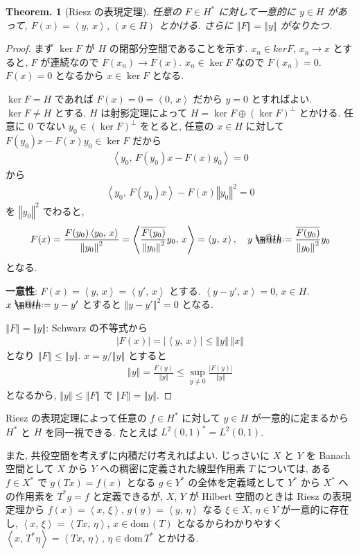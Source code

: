 \documentclass[openany, a4paper, oneside]{jsbook}
\makeatletter
\newcommand*{\defeq}{\mathrel{\rlap{%
\raisebox{0.3ex}{$\m@th\cdot$}}%
\raisebox{-0.3ex}{$\m@th\cdot$}}%
=}
\newcommand{\dom}{\mathrm{dom}\,}
\theoremstyle{break}
\newtheorem{thm}{Theorem.}[section]
\theoremstyle{breakdefn}
\newcommand{\abs}[1]{\left|#1\right|}
\newcommand{\norm}[1]{\left\Vert#1\right\Vert}
\newcommand{\rbk}[1]{\left (#1\right)}
\newcommand{\bkt}[2]{\left\langle#1,\,#2\right\rangle}
\makeatother
\begin{document}
\begin{thm}[Riesz の表現定理]\label{functional_analysis_hilbert_space_yukimi_11}
 任意の $F \in H^*$ に対して一意的に $y \in H$ があって, $F(x) = \bkt{y}{x}$, $(x \in H)$ とかける.
 さらに $\norm{F} = \norm{y}$ がなりたつ.
\end{thm}
\begin{proof}
まず $\ker F$ が $H$ の閉部分空間であることを示す.
$x_n \in ker F$, $x_{n} \to x$ とすると,
$F$ が連続なので $F (x_n) \to F (x)$.
$x_n \in \ker F$ なので $F (x_n) = 0$.
$F(x) = 0$ となるから $x \in \ker F$ となる.

$\ker F = H$ であれば $F(x) = 0 = \bkt{0}{x}$ だから $y = 0$ とすればよい.
$\ker F \neq H$ とする.
$H$ は射影定理によって $H = \ker F \oplus (\ker F)^\perp$ とかける.
任意に $0$ でない $y_0 \in (\ker F)^\perp$ をとると, 任意の $x \in H$ に対して
$F(y_0) x - F (x) y_0 \in \ker F$ だから
\begin{align}
 \bkt{y_0}{F \rbk{y_0} x - F(x) y_0}
 =
 0
\end{align}
から
\begin{align}
 \bkt{y_0}{F(y_0) x} - F(x) \norm{y_0}^2
 =
 0
\end{align}
を $\norm{y_0}^2$ でわると,
\begin{align}
 F(x)
 =
 \frac{F(y_0) \bkt{y_0}{x}}{\norm{y_0}^2}
 =
 \bkt{\frac{\overline{F(y_0)}}{\norm{y_0}^2} y_0}{x}
 =
 \bkt{y}{x}, \quad
 y
 \defeq
 \frac{\overline{F(y_0)}}{\norm{y_0}^2} y_0
\end{align}
となる.

\textbf{一意性}:
$F (x) = \bkt{y}{x} = \bkt{y'}{x}$ とする.
$\bkt{y - y'}{x} = 0$, $x \in H$.
$x \defeq y - y'$ とすると $\norm{y - y'}^2 = 0$ となる.

$\norm{F} = \norm{y}$:
Schwarz の不等式から
\begin{align}
 \abs{F(x)}
 =
 \abs{\bkt{y}{x}}
 \leq
 \norm{y} \, \norm{x}
\end{align}
となり $\norm{F} \leq \norm{y}$.
$x = y / \norm{y}$ とすると
\begin{align}
 \norm{y} = \frac{F(y)}{\norm{y}}
 \leq
 \sup_{y \neq 0} \frac{\abs{F(y)}}{\norm{y}}
\end{align}
となるから,  $\norm{y} \leq \norm{F}$ で $\norm{F} = \norm{y}$.
\end{proof}

Riesz の表現定理によって任意の $f \in H^*$ に対して $y \in H$ が一意的に定まるから
$H^*$ と $H$ を同一視できる.
たとえば $L^2 (0, 1)^* = L^2 (0, 1)$.

また, 共役空間を考えずに内積だけ考えればよい.
じっさいに $X$ と $Y$ を Banach 空間として $X$ から $Y$ への稠密に定義された線型作用素 $T$ については,
ある $f \in X^*$ で $g (Tx) = f (x)$ となる $g \in Y^*$ の全体を定義域として
$Y^*$ から $X^*$ への作用素を $T^*g = f$ と定義できるが,
$X$, $Y$ が Hilbert 空間のときは Riesz の表現定理から
$f (x) = \bkt{x}{\xi}$, $g (y) = \bkt{y}{\eta}$ なる $\xi \in X$,
$\eta \in Y$ が一意的に存在し,
$\bkt{x}{\xi} = \bkt{Tx}{\eta}$,
$x \in \dom (T)$ となるからわかりやすく
$\bkt{x}{T^* \eta} = \bkt{Tx}{\eta}$, $\eta \in \dom T^*$ とかける.
\end{document}
